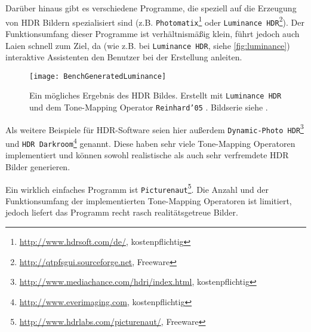 Darüber hinaus gibt es verschiedene Programme, die speziell auf die Erzeugung von \gls{HDR} Bildern spezialisiert sind (z.B. \texttt{Photomatix}\footnote{\url{http://www.hdrsoft.com/de/}, kostenpflichtig} oder \texttt{Luminance HDR}\footnote{\url{http://qtpfsgui.sourceforge.net}, Freeware}). Der Funktionsumfang dieser Programme ist verhältnismäßig klein, führt jedoch auch Laien schnell zum Ziel, da (wie z.B. bei \texttt{Luminance HDR}, siehe \autoref{fig:luminance}) interaktive Assistenten den Benutzer bei der Erstellung anleiten. 


\begin{figure}
  \begin{center}
    \texttt{[image: BenchGeneratedLuminance]}
    \caption{Ein mögliches Ergebnis des HDR Bildes. Erstellt mit \texttt{Luminance HDR} und dem \gls{Tone-Mapping} Operator \texttt{Reinhard'05} \cite{Reinhard05}. Bildserie siehe \cite{tellone}.}
    \label{fig:luminance}
  \end{center}
\end{figure}

Als weitere Beispiele für HDR-Software seien hier außerdem \texttt{Dynamic-Photo HDR}\footnote{\url{http://www.mediachance.com/hdri/index.html}, kostenpflichtig} und \texttt{HDR Darkroom}\footnote{\url{http://www.everimaging.com}, kostenpflichtig} genannt. Diese haben sehr viele \gls{Tone-Mapping} Operatoren implementiert und können sowohl realistische als auch sehr verfremdete \gls{HDR} Bilder generieren. 

Ein wirklich einfaches Programm ist \texttt{Picturenaut}\footnote{\url{http://www.hdrlabs.com/picturenaut/}, Freeware}. Die Anzahl und der Funktionsumfang der implementierten \gls{Tone-Mapping} Operatoren ist limitiert, jedoch liefert das Programm recht rasch realitätsgetreue Bilder.


